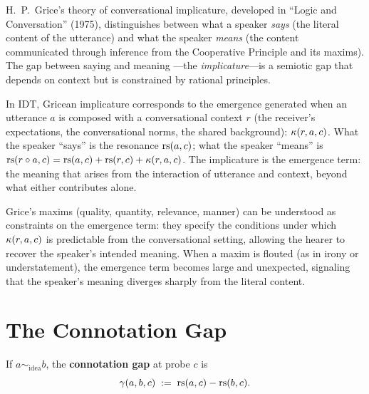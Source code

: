 \begin{interpretation}\label{interp:ch6:grice_implicature}
H.~P.~Grice's theory of conversational implicature, developed in
``Logic and Conversation'' (1975), distinguishes between what a speaker
\emph{says} (the literal content of the utterance) and what the speaker
\emph{means} (the content communicated through inference from the
Cooperative Principle and its maxims). The gap between saying and meaning
---the \emph{implicature}---is a semiotic gap that depends on context
but is constrained by rational principles.

In IDT, Gricean implicature corresponds to the emergence generated when
an utterance $a$ is composed with a conversational context $r$
(the receiver's expectations, the conversational norms, the shared
background): $\kappa(r, a, c)$. What the speaker ``says'' is the
resonance $\mathrm{rs}(a, c)$; what the speaker ``means'' is
$\mathrm{rs}(r \circ a, c) = \mathrm{rs}(a, c) + \mathrm{rs}(r, c) + \kappa(r, a, c)$.
The implicature is the emergence term: the meaning that arises from the
interaction of utterance and context, beyond what either contributes
alone.

Grice's maxims (quality, quantity, relevance, manner) can be understood
as constraints on the emergence term: they specify the conditions under
which $\kappa(r, a, c)$ is predictable from the conversational setting,
allowing the hearer to recover the speaker's intended meaning. When a
maxim is flouted (as in irony or understatement), the emergence term
becomes large and unexpected, signaling that the speaker's meaning
diverges sharply from the literal content.
\end{interpretation}

\section{The Connotation Gap}

\begin{definition}\label{def:connotation-gap}
If $a \sim_{\mathrm{idea}} b$, the \textbf{connotation gap} at probe $c$
is
\[
    \gamma(a, b, c) \;:=\; \mathrm{rs}(a, c) - \mathrm{rs}(b, c).
\]
\end{definition}


